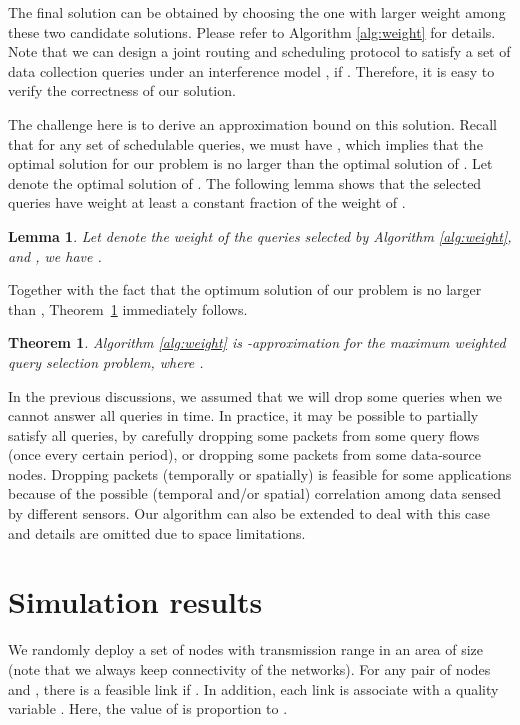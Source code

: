 \documentclass[conference,10pt]{IEEEtran}\usepackage{amsmath}
\newtheorem{boldtheorem}{\textbf{Theorem}}
\newtheorem{lemma}{{Lemma}}
\begin{document}
The final solution can be obtained by choosing the one
 with larger weight among these two candidate solutions.
Please refer to Algorithm \ref{alg:weight} for details. Note that we
can design a joint routing and scheduling protocol to satisfy a set
of data collection queries  under an interference model
, if .
Therefore, it is easy to verify the correctness of our solution.

The challenge here is to derive an approximation bound on this
solution. Recall that for any set of schedulable queries, we must
have ,
which implies that the optimal solution for our problem is no larger
than the optimal solution of . Let  denote
the optimal solution of . The following lemma shows that
the selected queries have weight at least a constant fraction of the
weight of .

\begin{lemma}\label{lem:weighted}
Let  denote the weight of the queries selected by
Algorithm \ref{alg:weight}, and , we have
.
\end{lemma}






Together with the fact that the optimum solution of our problem is
no larger than ,
Theorem~\ref{the:weighted_appr} immediately follows.
\begin{boldtheorem}\label{the:weighted_appr}
Algorithm \ref{alg:weight} is -approximation for the maximum
weighted query selection problem, where
 .
\end{boldtheorem}

In the previous discussions, we assumed that we will drop some
queries when we cannot answer all queries in time. In practice, it
may be
 possible to partially satisfy all queries, by carefully
 dropping some packets from some query flows (once every certain period), or
 dropping some packets from some data-source nodes.
  Dropping packets (temporally or spatially)
 is feasible for some applications because of the possible
 (temporal and/or spatial) correlation among data sensed by different
 sensors.
Our algorithm can also be extended to deal with this case and
details
 are omitted due to space limitations.



\section{Simulation results}
\label{sec:simulation}


We randomly deploy a set of nodes  with
transmission range 
 in an area of size  (note that we always keep
 connectivity of the networks).
For any pair of nodes  and , there is a feasible link
 if .
In addition, each link  is associate with a quality
variable . Here, the value of 
 is proportion to .
\end{document}
